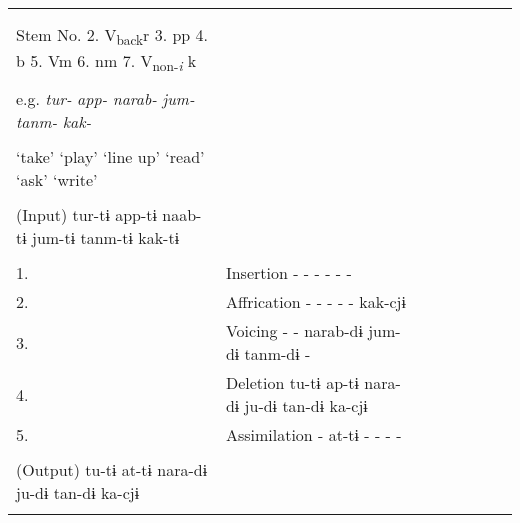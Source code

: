 \begin{table}
\begin{tabularx}{\textwidth}{XX lll lll}
\tablevspace                                                                                                                   \\
                                                                                                                               \\
Stem No.  2. V\textsubscript{back}r  3. pp  4. b  5. Vm  6. nm  7. V\textsubscript{non-}\textit{\textsubscript{i}} k           \\
                                                                                                                               \\
  e.g.  \textit{tur-}  \textit{app-}  \textit{narab-}  \textit{jum-}  \textit{tanm-}  \textit{kak-}\\                          \\
  ‘take’  ‘play’  ‘line up’  ‘read’  ‘ask’  ‘write’                                                                            \\
                                                                                                                               \\
  (Input)  tur-tɨ  app-tɨ  naab-tɨ  jum-tɨ  tanm-tɨ  kak-tɨ                                                                    \\
\midrule                                                                                                                       \\
1. & Insertion  -  -  -  -  -  -                                                                                               \\
2. & Affrication  -  -  -  -  -  kak-cjɨ                                                                                       \\
3. & Voicing  -  -  narab-dɨ  jum-dɨ  tanm-dɨ  -                                                                               \\
4. & Deletion  tu-tɨ  ap-tɨ  nara-dɨ  ju-dɨ  tan-dɨ  ka-cjɨ                                                                    \\
5. & Assimilation  -  at-tɨ  -  -  -  -                                                                                        \\
\midrule                                                                                                                       \\
  (Output)  tu-tɨ  at-tɨ  nara-dɨ  ju-dɨ  tan-dɨ  ka-cjɨ\\                                                                     \\

\end{tabularx}
\end{table}
